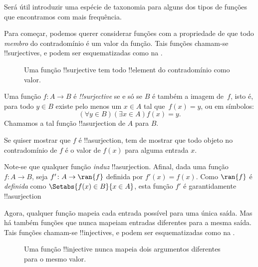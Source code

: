 \documentclass[../../../include/open-logic-section]{subfiles}
\begin{document}

\begin{explain}
Será útil introduzir uma espécie de taxonomia para alguns dos
tipos de funções que encontramos com mais frequência.

Para começar, podemos querer considerar funções com a propriedade de que
todo \emph{membro} do contradomínio é um valor da função. Tais
funções chamam-se !!{surjective}s, e podem ser esquematizadas como na
.

\begin{figure}[H]
  \caption{Uma função !!{surjective} tem todo !!{element} do
    contradomínio como valor.}
\end{figure}
\end{explain}

\begin{defn}
Uma função $f \colon A \rightarrow B$ é \emph{!!{surjective}} se e só se $B$
é também a imagem de~$f$, isto é, para todo $y \in B$ existe pelo menos
um $x \in A$ tal que~$f(x) = y$, ou em símbolos:
\[
  (\forall y \in B)(\exists x \in A)f(x) = y.
\]
Chamamos a tal função !!a{surjection} de $A$ para $B$.
\end{defn}

\begin{explain}
Se quiser mostrar que $f$ é !!a{surjection}, tem de mostrar que
todo objeto no contradomínio de $f$ é o valor de $f(x)$ para alguma
entrada $x$.

Note-se que qualquer função \emph{induz} !!a{surjection}. Afinal,
dada uma função $f \colon A \to B$, seja $f' \colon A \to \ran{f}$
definida por $f'(x) = f(x)$. Como $\ran{f}$ é \emph{definida} como
$\Setabs{f(x) \in B}{x \in A}$, esta função $f'$ é garantidamente
!!a{surjection}
\end{explain}

\begin{explain}
Agora, qualquer função mapeia cada entrada possível para uma única saída. Mas
há também funções que nunca mapeiam entradas diferentes para a mesma
saída. Tais funções chamam-se !!{injective}s, e podem ser esquematizadas
como na .
\begin{figure}[H]
  \caption{Uma função !!{injective} nunca mapeia dois
    argumentos diferentes para o mesmo valor.}
\end{figure}
\end{explain}
\end{document}
